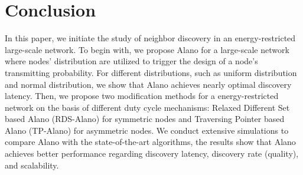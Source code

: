 \section{Conclusion}
\label{Conclusion}
In this paper, we initiate the study of neighbor discovery in an energy-restricted large-scale network.
To begin with, we propose Alano for a large-scale network where nodes' distribution are utilized to trigger the design of a node's transmitting probability. For different distributions, such as uniform distribution and normal distribution, we show that Alano achieves nearly optimal discovery latency. Then, we propose two modification methods for a energy-restricted network on the basis of different duty cycle mechanisms: Relaxed Different Set based Alano (RDS-Alano) for symmetric nodes and Traversing Pointer based Alano (TP-Alano) for asymmetric nodes. We conduct extensive simulations to compare Alano with the state-of-the-art algorithms, the results show that Alano achieves better performance regarding discovery latency, discovery rate (quality), and scalability.%
